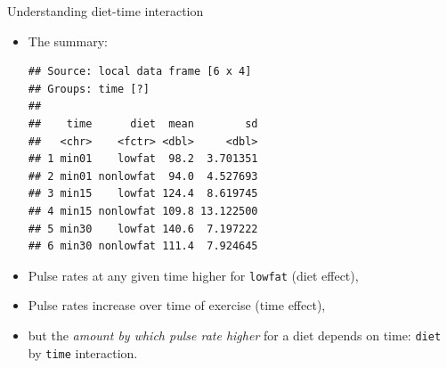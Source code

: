\begin{frame}[fragile]{Understanding diet-time interaction}

  \begin{itemize}
    \item The summary:
\begin{knitrout}
\color{fgcolor}\begin{kframe}
\begin{alltt}
\end{alltt}
\begin{verbatim}
## Source: local data frame [6 x 4]
## Groups: time [?]
## 
##    time      diet  mean        sd
##   <chr>    <fctr> <dbl>     <dbl>
## 1 min01    lowfat  98.2  3.701351
## 2 min01 nonlowfat  94.0  4.527693
## 3 min15    lowfat 124.4  8.619745
## 4 min15 nonlowfat 109.8 13.122500
## 5 min30    lowfat 140.6  7.197222
## 6 min30 nonlowfat 111.4  7.924645
\end{verbatim}
\end{kframe}
\end{knitrout}
  \item Pulse rates at any given time higher for \texttt{lowfat} (diet
  effect), 
  \item Pulse rates increase over time of exercise (time effect),
    
  \item but the \emph{amount by which pulse rate higher} for a diet depends on
  time: \texttt{diet} by \texttt{time} interaction.

  \end{itemize}
  
\end{frame}


